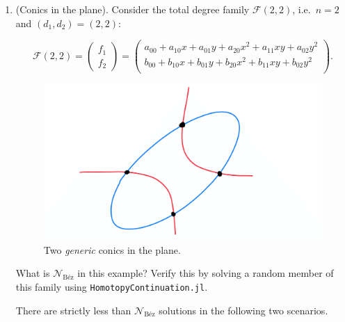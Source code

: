 \documentclass[11pt,reqno]{amsart}
\theoremstyle{definition}
\theoremstyle{remark}
\numberwithin{equation}{section}
\begin{document}
\begin{enumerate}
\item (Conics in the plane). Consider the total degree family $\mathcal{F}(2,2)$, i.e.~$n = 2$ and $(d_1, d_2) = (2,2)$:

$$ \mathcal{F}(2,2) = \begin{pmatrix}
f_1 \\ f_2
\end{pmatrix}  = \begin{pmatrix}
a_{00} + a_{10} x + a_{01} y + a_{20}x^2 + a_{11}xy + a_{02} y^2 \\
b_{00} + b_{10} x + b_{01} y + b_{20}x^2 + b_{11}xy + b_{02} y^2 \\
\end{pmatrix}. $$
\begin{figure}[!htpb]
\centering
\includegraphics[scale=0.04]{Pictures_SANNA-4-1.png}
\caption{Two \emph{generic} conics in the plane.}
\end{figure}
What is $\mathcal{N}_{\text{Béz}}$ in this example? Verify this by solving a random member of this family using \texttt{HomotopyContinuation.jl}.

There are strictly less than $\mathcal{N}_{\text{Béz}}$  solutions in the following two scenarios.


\end{enumerate}
\end{document}
